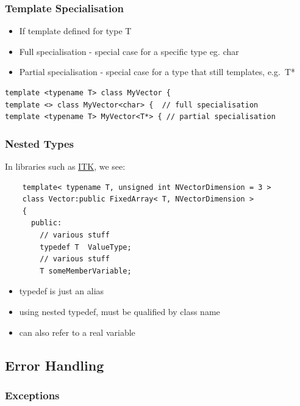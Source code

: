 \subsubsection{Template Specialisation}\label{template-specialisation}

\begin{itemize}
\itemsep1pt\parskip0pt
\item
  If template defined for type T
\item
  Full specialisation - special case for a specific type eg. char
\item
  Partial specialisation - special case for a type that still templates,
  e.g.~T*
\end{itemize}

\begin{verbatim}
template <typename T> class MyVector {
template <> class MyVector<char> {  // full specialisation
template <typename T> MyVector<T*> { // partial specialisation
\end{verbatim}

\subsubsection{Nested Types}\label{nested-types}

In libraries such as \href{http://www.itk.org}{ITK}, we see:

\begin{verbatim}
    template< typename T, unsigned int NVectorDimension = 3 >
    class Vector:public FixedArray< T, NVectorDimension >
    {
      public:
        // various stuff
        typedef T  ValueType;
        // various stuff
        T someMemberVariable;
\end{verbatim}

\begin{itemize}
\itemsep1pt\parskip0pt
\item
  typedef is just an alias
\item
  using nested typedef, must be qualified by class name
\item
  can also refer to a real variable
\end{itemize}

\subsection{Error Handling}\label{error-handling}

\subsubsection{Exceptions}\label{exceptions}

